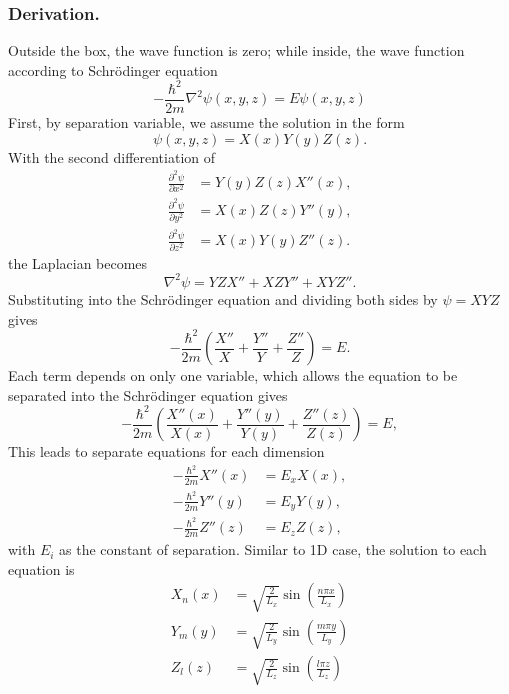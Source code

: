 \documentclass[../../../main.tex]{subfiles}
\begin{document}
\subsubsection{Derivation.}
Outside the box, the wave function is zero; while inside, the wave function according to Schrödinger equation
\begin{equation*}
    -\frac{\hbar^2}{2m} \nabla^2 \psi(x,y,z) = E \psi(x,y,z)
\end{equation*}
First, by separation variable, we assume the solution in the form
\begin{equation*}
    \psi(x,y,z) = X(x) Y(y) Z(z).
\end{equation*}
With the second differentiation of
\begin{align*}
    \frac{\partial^2 \psi}{\partial x^2} & = Y(y) Z(z) X''(x), \\
    \frac{\partial^2 \psi}{\partial y^2} & = X(x) Z(z) Y''(y), \\
    \frac{\partial^2 \psi}{\partial z^2} & = X(x) Y(y) Z''(z).
\end{align*}
the Laplacian becomes
\begin{equation*}
    \nabla^2 \psi = Y Z X'' + X Z Y'' + X Y Z''.
\end{equation*}
Substituting into the Schrödinger equation and dividing both sides by \(\psi = X Y Z\) gives
\begin{equation*}
    -\frac{\hbar^2}{2m} \left( \frac{X''}{X} + \frac{Y''}{Y} + \frac{Z''}{Z} \right) = E.
\end{equation*}
Each term depends on only one variable, which allows the equation to be separated into the Schrödinger equation gives
\begin{equation*}
    -\frac{\hbar^2}{2m} \left( \frac{X''(x)}{X(x)} + \frac{Y''(y)}{Y(y)} + \frac{Z''(z)}{Z(z)} \right) = E,
\end{equation*}
This leads to separate equations for each dimension
\begin{align*}
    -\frac{\hbar^2}{2m} X''(x) & = E_x X(x), \\
    -\frac{\hbar^2}{2m} Y''(y) & = E_y Y(y), \\
    -\frac{\hbar^2}{2m} Z''(z) & = E_z Z(z),
\end{align*}
with $E_i$ as the constant of separation.
Similar to 1D case, the solution to each equation is
\begin{align*}
    X_n(x) & = \sqrt{\frac{2}{L_x}} \sin\left(\frac{n \pi x}{L_x}\right) \\
    Y_m(y) & = \sqrt{\frac{2}{L_y}} \sin\left(\frac{m \pi y}{L_y}\right) \\
    Z_l(z) & = \sqrt{\frac{2}{L_z}} \sin\left(\frac{l \pi z}{L_z}\right)
\end{align*}
\end{document}
